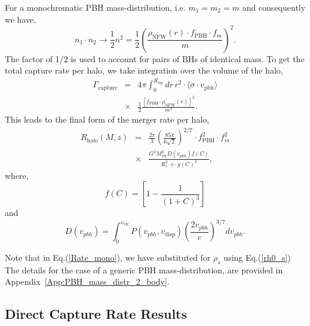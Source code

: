 \documentclass[aps, prd, reprint, nofootinbib]{revtex4-2}
\begin{document}
For a monochromatic PBH mass-distribution, i.e. $m_{1} = m_{2} = m$ and consequently we have, 
\begin{equation}
n_{1}\cdot n_{2} \rightarrow \frac{1}{2} n^2 = \frac{1}{2} \left( \frac{\rho_{\textrm{NFW}}(r) \cdot f_{\textrm{PBH}} \cdot f_{m}}{m} \right)^{2}. 
\end{equation}
The factor of 1/2 is used to account for pairs of BHs of identical mass. %
To get the total capture rate per halo, we take integration over the volume of the halo,
\begin{eqnarray}
\Gamma_{\textrm{capture}} &=& 4\pi \int_{0}^{R_{\textrm{vir}}}dr \, r^2 \cdot \langle \sigma \cdot v_{\textrm{pbh}} \rangle  \\ &\times& \frac{1}{2} \frac{ \left[f_{\textrm{PBH}} \cdot \rho_{\textrm{NFW}}(r)\right]^2}{m^2}. \nonumber
\label{eq:Capture_Mono}
\end{eqnarray}
This leads to the final form of the merger rate per halo,
\begin{eqnarray}
\label{Rate_mono}
R_{\textrm{halo}}(M,z)&=&\frac{2 \pi }{3}\left(\frac{85 \pi}{6 \sqrt{2}}\right)^{2 / 7} \cdot f_{\textrm{PBH}}^2 \cdot f_{m}^2 \nonumber \\ 
&\times& \frac{G^2 M_{\textrm{vir}}^2 D(v_{pbh}) f(C)}{R_s^3\cdot  c \cdot  g(C)^2}, 
\end{eqnarray}
where, 
\begin{equation}
f(C)=\left[1-\frac{1}{(1+C)^3}\right]
\end{equation}
and 
\begin{equation}
D(v_{pbh})=\int_0^{v_{\textrm{vir}}} P\left(v_{pbh}, v_{\textrm{disp}}\right)\left(\frac{2 v_{pbh}}{c}\right)^{3 / 7} d v_{pbh}.
\end{equation}


Note that in Eq.(\ref{Rate_mono}), we have substituted for $\rho_{s}$ using Eq.(\ref{rh0_s})
The details for the case of a generic PBH mass-distribution, are provided in Appendix~\ref{App:PBH_mass_distr_2_body}.



\subsection{Direct Capture Rate Results}
\end{document}
